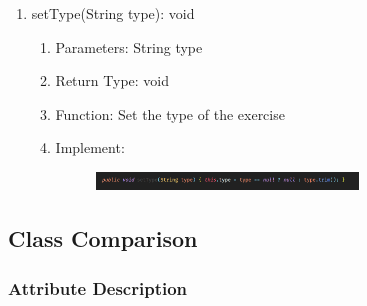 \documentclass[16pt]{scrreprt}
\begin{document}
\begin{enumerate}
		\item setType(String type): void
	\begin{enumerate}
		\item Parameters: String type
		\item Return Type: void
		\item Function: Set the type of the exercise
		\item Implement:
		\begin{figure}[H]
	\centering
	\includegraphics[width=0.7\textwidth]{diagrams/ex-settype.png}\\
\end{figure}
	\end{enumerate}
\end{enumerate}
	
	
\subsection{Class Comparison}
\subsubsection{Attribute Description}
\end{document}

